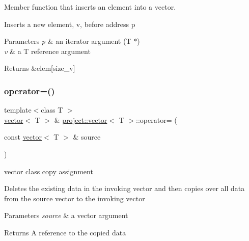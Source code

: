 Member function that inserts an element into a vector. 

Inserts a new element, v, before address p 
\begin{DoxyParams}{Parameters}
{\em p} & an iterator argument (T $\ast$) \\
\hline
{\em v} & a T reference argument \\
\hline
\end{DoxyParams}
\begin{DoxyReturn}{Returns}
\&elem\mbox{[}size\+\_\+v\mbox{]} 
\end{DoxyReturn}
\mbox{\label{classproject_1_1vector_a0c815ad332028cd9c33ea6a441c6b54f}} 
\subsubsection{\texorpdfstring{operator=()}{operator=()}\hspace{0.1cm}{\footnotesize\ttfamily [1/2]}}
{\footnotesize\ttfamily template$<$class T $>$ \\
\mbox{\hyperlink{classproject_1_1vector}{vector}}$<$ T $>$ \& \mbox{\hyperlink{classproject_1_1vector}{project\+::vector}}$<$ T $>$\+::operator= (\begin{DoxyParamCaption}\item[{const \mbox{\hyperlink{classproject_1_1vector}{vector}}$<$ T $>$ \&}]{source }\end{DoxyParamCaption})\hspace{0.3cm}{\ttfamily [inline]}}



vector class copy assignment 

Deletes the existing data in the invoking vector and then copies over all data from the source vector to the invoking vector 
\begin{DoxyParams}{Parameters}
{\em source} & a vector argument \\
\hline
\end{DoxyParams}
\begin{DoxyReturn}{Returns}
A reference to the copied data 
\end{DoxyReturn}
\mbox{\label{classproject_1_1vector_aadeeb218c94243fed0d8c6c14f1ac62d}} 
